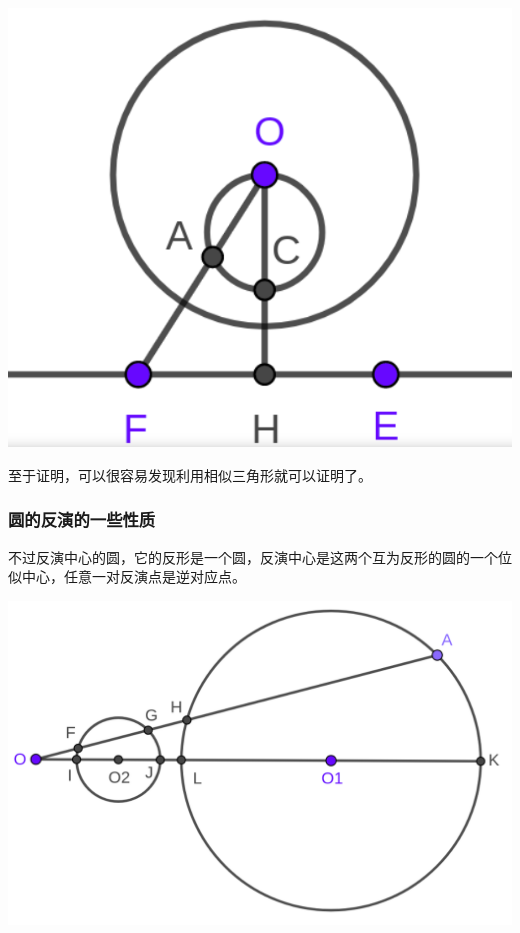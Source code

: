 \documentclass[10pt]{beamer}
\begin{document}
\begin{CJK}{UTF8}{gkai}
\begin{spacing}{1.2}
\begin{frame}
			\begin{center}
			\includegraphics[scale=0.14]{../Pictures/Circle_Inversion_1.png}
			\end{center}

			至于证明，可以很容易发现利用相似三角形就可以证明了。

		\end{frame}
		\begin{frame}
			\frametitle{圆的反演的一些性质}

			不过反演中心的圆，它的反形是一个圆，反演中心是这两个互为反形的圆的一个位似中心，任意一对反演点是逆对应点。 \pause

			\begin{center}
			\includegraphics[scale=0.14]{../Pictures/Circle_Inversion_2.png}
			\end{center}


\end{frame}
\end{spacing}
\end{CJK}
\end{document}
